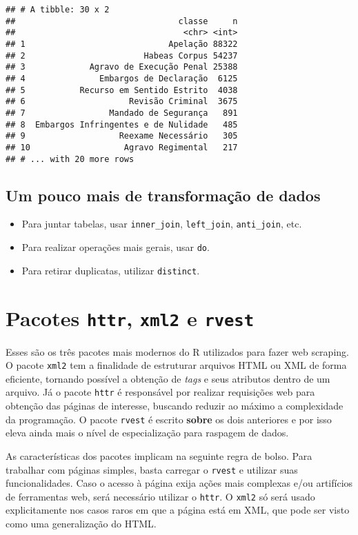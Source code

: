 \documentclass[]{book}
\providecommand{\tightlist}{%
  \setlength{\itemsep}{0pt}\setlength{\parskip}{0pt}}
\begin{document}
\begin{verbatim}
## # A tibble: 30 x 2
##                                 classe     n
##                                  <chr> <int>
## 1                             Apelação 88322
## 2                        Habeas Corpus 54237
## 3             Agravo de Execução Penal 25388
## 4               Embargos de Declaração  6125
## 5           Recurso em Sentido Estrito  4038
## 6                     Revisão Criminal  3675
## 7                 Mandado de Segurança   891
## 8  Embargos Infringentes e de Nulidade   485
## 9                   Reexame Necessário   305
## 10                   Agravo Regimental   217
## # ... with 20 more rows
\end{verbatim}

\subsection{Um pouco mais de transformação de
dados}\label{um-pouco-mais-de-transformacao-de-dados}

\begin{itemize}
\tightlist
\item
  Para juntar tabelas, usar \texttt{inner\_join}, \texttt{left\_join},
  \texttt{anti\_join}, etc.
\item
  Para realizar operações mais gerais, usar \texttt{do}.
\item
  Para retirar duplicatas, utilizar \texttt{distinct}.
\end{itemize}

\section{\texorpdfstring{Pacotes \texttt{httr}, \texttt{xml2} e
\texttt{rvest}}{Pacotes httr, xml2 e rvest}}\label{pacotes-httr-xml2-e-rvest}

Esses são os três pacotes mais modernos do R utilizados para fazer web
scraping. O pacote \texttt{xml2} tem a finalidade de estruturar arquivos
HTML ou XML de forma eficiente, tornando possível a obtenção de
\emph{tags} e seus atributos dentro de um arquivo. Já o pacote
\texttt{httr} é responsável por realizar requisições web para obtenção
das páginas de interesse, buscando reduzir ao máximo a complexidade da
programação. O pacote \texttt{rvest} é escrito \textbf{sobre} os dois
anteriores e por isso eleva ainda mais o nível de especialização para
raspagem de dados.

As características dos pacotes implicam na seguinte regra de bolso. Para
trabalhar com páginas simples, basta carregar o \texttt{rvest} e
utilizar suas funcionalidades. Caso o acesso à página exija ações mais
complexas e/ou artifícios de ferramentas web, será necessário utilizar o
\texttt{httr}. O \texttt{xml2} só será usado explicitamente nos casos
raros em que a página está em XML, que pode ser visto como uma
generalização do HTML.
\end{document}
